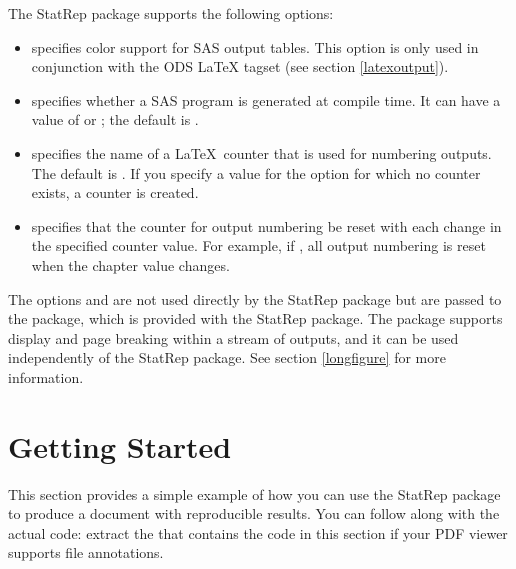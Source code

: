 \documentclass[article,oneside]{memoir}
\newcommand*{\StatRep}{\textsf{StatRep}\xspace}
\begin{document}
 The \StatRep package supports the following options:
     \begin{itemize}
     \item {} specifies color support for SAS output tables.
     This option is only used in conjunction with
     the ODS LaTeX tagset (see section \ref{latexoutput}).

     \item {} specifies whether a SAS program
     is generated at compile time. 
     It can have a value of  or ; the default is .

     \item {} specifies the name of a \LaTeX\ counter
     that is used for numbering outputs.
     The default is . If you specify a value for the 
     option for which no counter exists,
     a counter is created.

     \item {} specifies that the counter for output numbering be reset with
     each change in the specified counter value. For example, if ,
     all output numbering is reset when the chapter value changes.
     \end{itemize}

     The options  and  are not used directly by the \StatRep
     package but are passed to the  package, which
     is provided with the \StatRep package.
    The  package
    supports display and page breaking within a stream of outputs, and it can be
    used independently of the \StatRep package. See section \ref{longfigure} for
more information.

\chapter{Getting Started}\label{gs}

This section provides a simple example of how you can use the \StatRep package
to produce a document with reproducible results.
You can follow along with the actual code: extract the
 that
contains the code in this section if your PDF viewer supports file annotations.
\end{document}
